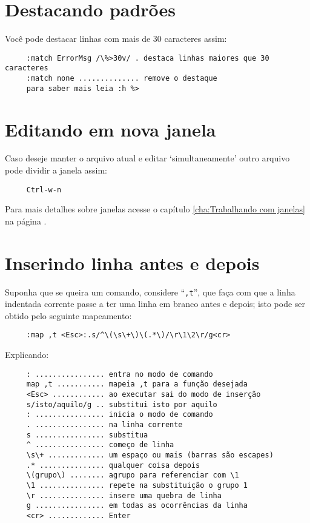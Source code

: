 \section{Destacando padrões}\label{sec:Destacando padrões}

Você pode destacar linhas com mais de 30 caracteres assim:

\begin{verbatim}
     :match ErrorMsg /\%>30v/ . destaca linhas maiores que 30 caracteres
     :match none .............. remove o destaque
     para saber mais leia :h %>
\end{verbatim}


\section{Editando em nova janela}\label{Editando em nova janela}

Caso deseje manter o arquivo atual e editar `simultaneamente' outro arquivo
pode dividir a janela assim:

\begin{verbatim}
     Ctrl-w-n
\end{verbatim}

Para mais detalhes sobre janelas acesse o capítulo
\ref{cha:Trabalhando com janelas} na página \pageref{cha:Trabalhando
com janelas}.


\section{Inserindo linha antes e depois}

Suponha que se queira um comando, considere ``\verb|,t|'', que faça com que a
linha indentada corrente passe a ter uma linha em branco antes e depois; isto
pode ser obtido pelo seguinte mapeamento:

\begin{verbatim}
     :map ,t <Esc>:.s/^\(\s\+\)\(.*\)/\r\1\2\r/g<cr>
\end{verbatim}
     
Explicando:
     
\begin{verbatim}
     : ................ entra no modo de comando
     map ,t ........... mapeia ,t para a função desejada
     <Esc> ............ ao executar sai do modo de inserção
     s/isto/aquilo/g .. substitui isto por aquilo
     : ................ inicia o modo de comando
     . ................ na linha corrente
     s ................ substitua
     ^ ................ começo de linha
     \s\+ ............. um espaço ou mais (barras são escapes)
     .* ............... qualquer coisa depois
     \(grupo\) ........ agrupo para referenciar com \1
     \1 ............... repete na substituição o grupo 1
     \r ............... insere uma quebra de linha
     g ................ em todas as ocorrências da linha
     <cr> ............. Enter
\end{verbatim}

